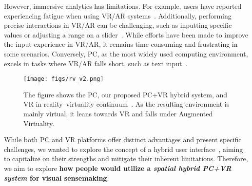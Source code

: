 However, immersive analytics has limitations. For example, users have reported experiencing fatigue when using VR/AR systems~\cite{mcmahan2012evaluating}. Additionally, performing precise interactions in VR/AR can be challenging, such as inputting specific values or adjusting a range on a slider~\cite{cordeil2020embodied}. 
While efforts have been made to improve the input experience in VR/AR, it remains time-consuming and frustrating in some scenarios.
Conversely, PC, as the most widely used computing environment, excels in tasks where VR/AR falls short, such as text input~\cite{mcgill2015dose}.

\begin{figure}
\centering
\texttt{[image: figs/rv\_v2.png]}
\caption{The figure shows the PC, our proposed PC+VR hybrid system, and VR in reality–virtuality continuum~\cite{milgram1995augmented}. As the resulting environment is mainly virtual, it leans towards VR and falls under Augmented Virtuality.}
\label{fig:rv}
\end{figure}

\IEEEpubidadjcol %

While both PC and VR platforms offer distinct advantages and present specific challenges, we wanted to explore the concept of a hybrid user interface~\cite{feiner1991hybrid}, aiming to capitalize on their strengths and mitigate their inherent limitations. 
Therefore, we aim to explore \textbf{how people would utilize a \textit{spatial hybrid PC+VR system} for visual sensemaking}.

